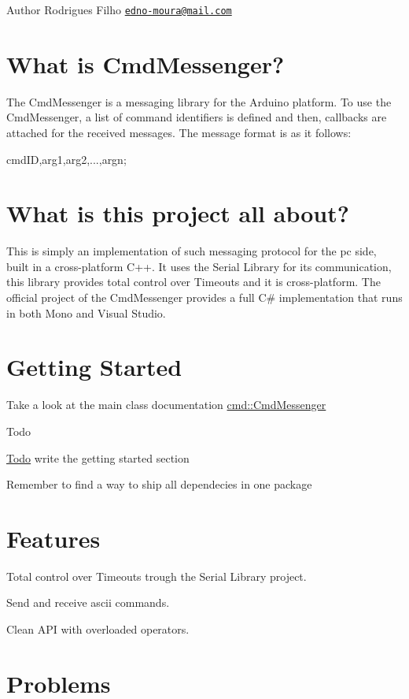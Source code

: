 \begin{DoxyAuthor}{Author}
Rodrigues Filho \href{mailto:edno-moura@mail.com}{\tt edno-\/moura@mail.\+com}
\end{DoxyAuthor}
\hypertarget{index_what_is}{}\section{What is Cmd\+Messenger?}\label{index_what_is}
The Cmd\+Messenger is a messaging library for the Arduino platform. To use the Cmd\+Messenger, a list of command identifiers is defined and then, callbacks are attached for the received messages. The message format is as it follows\+: 
\begin{DoxyPre}
  cmdID,arg1,arg2,...,argn;
\end{DoxyPre}
\hypertarget{index_this_project}{}\section{What is this project all about?}\label{index_this_project}
This is simply an implementation of such messaging protocol for the pc side, built in a cross-\/platform C++. It uses the Serial Library for its communication, this library provides total control over Timeouts and it is cross-\/platform. The official project of the Cmd\+Messenger provides a full C\# implementation that runs in both Mono and Visual Studio.\hypertarget{index_getting_started}{}\section{Getting Started}\label{index_getting_started}
Take a look at the main class documentation \hyperlink{classcmd_1_1_cmd_messenger}{cmd\+::\+Cmd\+Messenger}

\begin{DoxyRefDesc}{Todo}
\item[\hyperlink{todo__todo000001}{Todo}]write the getting started section 

Remember to find a way to ship all dependecies in one package \end{DoxyRefDesc}
\hypertarget{index_features}{}\section{Features}\label{index_features}

\begin{DoxyItemize}
\item Total control over Timeouts trough the Serial Library project.
\item Send and receive ascii commands.
\item Clean A\+P\+I with overloaded operators.
\end{DoxyItemize}\hypertarget{index_problems}{}\section{Problems}\label{index_problems}

